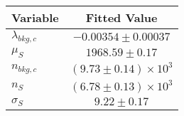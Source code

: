 \begin{tabular}[t]{lc}
\hline
Variable &Fitted Value\\
\hline\hline
$\lambda_{bkg,c}$&$-0.00354\pm0.00037$\\
\hline
$\mu_{S}$&$1968.59\pm0.17$\\
\hline
$n_{bkg,c}$&$(9.73\pm0.14)\times 10^3$\\
\hline
$n_{S}$&$(6.78\pm0.13)\times 10^3$\\
\hline
$\sigma_{S}$&$9.22\pm0.17$\\
\hline
\end{tabular}